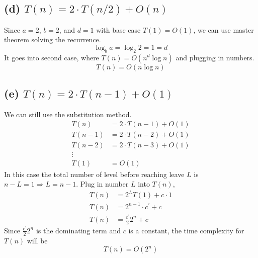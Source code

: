 \documentclass{article}
\begin{document}
\subsection*{(d) $T(n) = 2\cdot T(n/2) + O(n)$}
Since $a = 2$, $b = 2$, and $d = 1$ with base case $T(1) = O(1)$, we can use master theorem solving the recurrence.
$$\log_b a = \log_2 2 = 1 = d$$
It goes into second case, where $T(n) = O(n^d\log n)$ and plugging in numbers.
$$T(n) = O(n\log n)$$

\subsection*{(e) $T(n) = 2\cdot T(n-1) + O(1)$ }
We can still use the substitution method.
    \begin{align}
        T(n) &= 2\cdot T(n-1) + O(1) \nonumber \\
        T(n-1) &= 2\cdot T(n-2) + O(1) \nonumber \\
        T(n-2) &=  2\cdot T(n-3) + O(1) \nonumber \\
        \vdots \nonumber \\
        T(1) &= O(1) \nonumber
    \end{align}
In this case the total number of level before reaching leave $L$ is $n-L = 1 \Rightarrow 
L = n-1$.  Plug in number $L$ into $T(n)$,
    \begin{align}
        T(n) &= 2^{L}T(1) + c \cdot 1 \nonumber \\
        T(n) &= 2^{n-1} \cdot c^\prime  + c \nonumber \\
        T(n) &= \frac{c^\prime}{2} 2^{n} + c \nonumber
    \end{align}
Since $\frac{c^\prime}{2} 2^{n}$ is the dominating term and $c$ is a constant, the time complexity for $T(n)$ will be 
$$T(n) = O(2^n)$$
\end{document}
